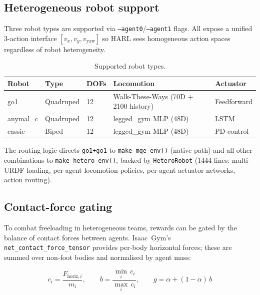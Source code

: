 \begin{dirtree}
\subsection{Heterogeneous robot support}

Three robot types are supported via \texttt{--agent0}/\texttt{--agent1}
flags. All expose a unified 3-action interface $[v_x, v_y, v_\text{yaw}]$
so HARL sees homogeneous action spaces regardless of robot heterogeneity.

\begin{table}[h]
  \centering
  \caption{Supported robot types.}
  \label{tab:robots}
  \begin{tabular}{lllll}
    \toprule
    \textbf{Robot} & \textbf{Type} & \textbf{DOFs} & \textbf{Locomotion} & \textbf{Actuator} \\
    \midrule
    go1      & Quadruped & 12 & Walk-These-Ways (70D + 2100 history) & Feedforward \\
    anymal\_c & Quadruped & 12 & legged\_gym MLP (48D) & LSTM \\
    cassie   & Biped     & 12 & legged\_gym MLP (48D) & PD control \\
    \bottomrule
  \end{tabular}
\end{table}

The routing logic directs \texttt{go1+go1} to \texttt{make\_mqe\_env()}
(native path) and all other combinations to \texttt{make\_hetero\_env()},
backed by \texttt{HeteroRobot} (1444 lines: multi-URDF loading, per-agent
locomotion policies, per-agent actuator networks, action routing).

\subsection{Contact-force gating}

To combat freeloading in heterogeneous teams, rewards can be gated by the
balance of contact forces between agents.  Isaac~Gym's
\texttt{net\_contact\_force\_tensor} provides per-body horizontal forces;
these are summed over non-foot bodies and normalised by agent mass:

\begin{equation}
  c_i = \frac{F_{\text{horiz},i}}{m_i}, \qquad
  b = \frac{\min_i\, c_i}{\max_i\, c_i}, \qquad
  g = \alpha + (1-\alpha)\, b
  \label{eq:cf-gate}
\end{equation}


\end{dirtree}

